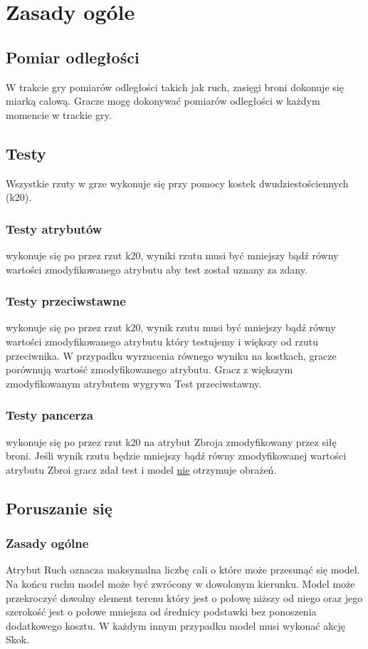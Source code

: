 \chapter{Zasady ogóle}

\section{Pomiar odległości}
W trakcie gry pomiarów odległości takich jak ruch, zasięgi broni dokonuje się miarką calową. Gracze mogę dokonywać pomiarów odległości w każdym momencie w trackie gry. 

\section{Testy}

Wszystkie rzuty w grze wykonuje się przy pomocy kostek dwudziestościennych (k20).

\subsection{Testy atrybutów} wykonuje się po przez rzut k20, wyniki rzutu musi być mniejszy bądź równy wartości zmodyfikowanego atrybutu aby test został uznany za zdany. 

\subsection{Testy przeciwstawne} wykonuje się po przez rzut k20, wynik rzutu musi być mniejszy bądź równy wartości zmodyfikowanego atrybutu który testujemy i większy od rzutu przeciwnika. W przypadku wyrzucenia równego wyniku na kostkach, gracze porównują wartość zmodyfikowanego atrybutu. Gracz z większym zmodyfikowanym atrybutem wygrywa Test przeciwstawny. 
\subsection{Testy pancerza} wykonuje się po przez rzut k20 na atrybut Zbroja zmodyfikowany przez siłę broni. Jeśli wynik rzutu będzie mniejszy bądź równy zmodyfikowanej wartości atrybutu Zbroi gracz zdał test i model \underline{nie} otrzymuje obrażeń.


\section{Poruszanie się}
\subsection{Zasady ogólne}
Atrybut Ruch oznacza maksymalna liczbę cali o które może przesunąć się model. Na końcu ruchu model może być zwrócony w dowolonym kierunku. Model może przekroczyć dowolny element terenu który jest o połowę niższy od niego oraz jego szerokość jest o połowe mniejsza od średnicy podstawki bez ponoszenia dodatkowego kosztu. W każdym innym przypadku model musi wykonać akcję Skok. 

